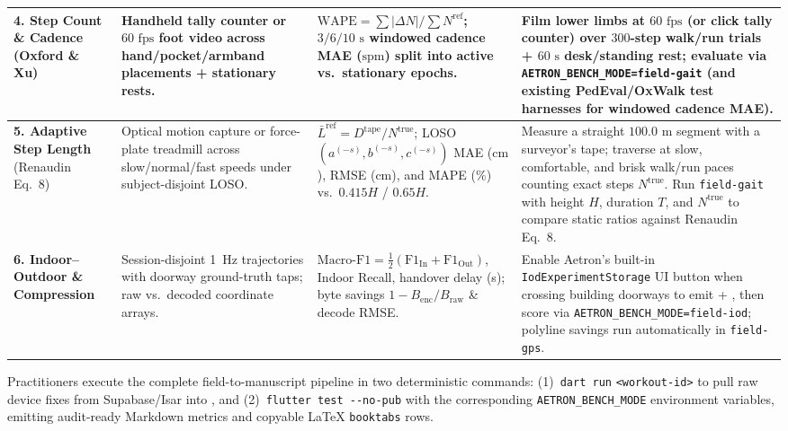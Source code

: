 \documentclass[journal]{IEEEtran}
\begin{document}
\begin{table}[t]
\begin{tabularx}{\textwidth}{L{2.4cm} L{3.6cm} L{4.4cm} Y}
\midrule
\textbf{4. Step Count \& Cadence} (Oxford \& Xu) \cite{salvi2018oxford,xu2022step}
  & Handheld tally counter or $60\text{ fps}$ foot video across hand/pocket/armband placements + stationary rests.
  & $\mathrm{WAPE} = \sum |\Delta N| / \sum N^{\text{ref}}$; $3/6/10\text{ s}$ windowed cadence MAE ($\text{spm}$) split into active vs.\ stationary epochs.
  & Film lower limbs at $60\text{ fps}$ (or click tally counter) over $300$-step walk/run trials + $60\text{ s}$ desk/standing rest; evaluate via \texttt{AETRON\_BENCH\_MODE=field-gait} (and existing PedEval/OxWalk test harnesses for windowed cadence MAE). \\
\midrule
\textbf{5. Adaptive Step Length} (Renaudin Eq.~8) \cite{renaudin2012step,fukuchi2017public}
  & Optical motion capture or force-plate treadmill across slow/normal/fast speeds under subject-disjoint LOSO.
  & $\bar{L}^{\text{ref}} = D^{\text{tape}} / N^{\text{true}}$; LOSO $(a^{(-s)}, b^{(-s)}, c^{(-s)})$ MAE ($\text{cm}$), RMSE ($\text{cm}$), and MAPE ($\%$) vs.\ $0.415H$ / $0.65H$.
  & Measure a straight $100.0\text{ m}$ segment with a surveyor's tape; traverse at slow, comfortable, and brisk walk/run paces counting exact steps $N^{\text{true}}$. Run \texttt{field-gait} with height $H$, duration $T$, and $N^{\text{true}}$ to compare static ratios against Renaudin Eq.~8. \\
\midrule
\textbf{6. Indoor--Outdoor \& Compression} \cite{dastagir2024deepiod,bakirtzis2022ciod}
  & Session-disjoint 1~Hz trajectories with doorway ground-truth taps; raw vs.\ decoded coordinate arrays.
  & $\text{Macro-F1} = \frac{1}{2}(\mathrm{F1}_{\text{In}} + \mathrm{F1}_{\text{Out}})$, Indoor Recall, handover delay (s); byte savings $1 - B_{\text{enc}}/B_{\text{raw}}$ \& decode RMSE.
  & Enable Aetron's built-in \texttt{IodExperimentStorage} UI button when crossing building doorways to emit  + , then score via \texttt{AETRON\_BENCH\_MODE=field-iod}; polyline savings run automatically in \texttt{field-gps}. \\
\bottomrule
\end{tabularx}
\end{table}

Practitioners execute the complete field-to-manuscript pipeline in two deterministic commands: (1)~\texttt{dart run}  \texttt{<workout-id>} to pull raw device fixes from Supabase/Isar into , and (2)~\texttt{flutter test -{}-no-pub}  with the corresponding \texttt{AETRON\_BENCH\_MODE} environment variables, emitting audit-ready Markdown metrics and copyable \LaTeX{} \texttt{booktabs} rows.
\end{document}
